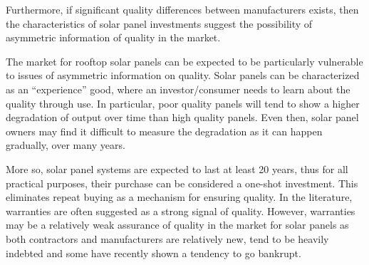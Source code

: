 \documentclass[a4paper]{article}
\begin{document}
Furthermore, if significant quality differences between manufacturers exists, then the characteristics of solar panel investments suggest the possibility of asymmetric information of quality in the market.



The market for rooftop solar panels can be expected to be particularly vulnerable to issues of asymmetric information on quality. Solar panels can be characterized as an ``experience'' good, where an investor/consumer needs to learn about the quality through use. In particular, poor quality panels will tend to show a higher degradation of output over time than high quality panels. Even then, solar panel owners may find it difficult to measure the degradation as it can happen gradually, over many years.

More so, solar panel systems are expected to last at least 20 years, thus for all practical purposes, their purchase can be considered a one-shot investment. This eliminates repeat buying as a mechanism for ensuring quality. In the literature, warranties are often suggested as a strong signal of quality. However, warranties may be a relatively weak assurance of quality in the market for solar panels as both contractors and manufacturers are relatively new, tend to be heavily indebted and some have recently shown a tendency to go bankrupt.
\end{document}
